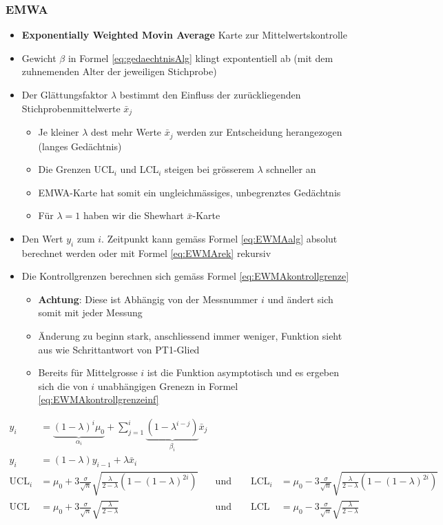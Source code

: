 \subsubsection{EMWA}
\begin{itemize}
	\item \textbf{Exponentially Weighted Movin Average} Karte zur Mittelwertskontrolle
	\item Gewicht $\beta$ in Formel \ref{eq:gedaechtnisAlg} klingt expontentiell ab (mit dem zuhnemenden \glqq Alter \grqq der jeweiligen Stichprobe)
	\item Der Glättungsfaktor $\lambda$ bestimmt den Einfluss der zurückliegenden Stichprobenmittelwerte $\bar{x}_j$
	\begin{itemize}
		\item Je kleiner $\lambda$ dest mehr Werte $\bar{x}_j$ werden zur Entscheidung herangezogen (langes Gedächtnis)
		\item Die Grenzen UCL$_i$ und LCL$_i$ steigen bei grösserem $\lambda$ schneller an
		\item EMWA-Karte hat somit ein ungleichmässiges, unbegrenztes Gedächtnis
		\item Für $\lambda=1$ haben wir die Shewhart $\bar{x}$-Karte
	\end{itemize}
	\item Den Wert $y_i$ zum $i.$ Zeitpunkt kann gemäss Formel \ref{eq:EWMAalg} absolut berechnet werden oder mit Formel \ref{eq:EWMArek} rekursiv
	\item Die Kontrollgrenzen berechnen sich gemäss Formel \ref{eq:EWMAkontrollgrenze}
	\begin{itemize}
		\item \textbf{Achtung}: Diese ist Abhängig von der Messnummer $i$ und ändert sich somit mit jeder Messung 
		\item Änderung zu beginn stark, anschliessend immer weniger, Funktion sieht aus wie Schrittantwort von PT1-Glied
		\item Bereits für Mittelgrosse $i$ ist die Funktion asymptotisch und es ergeben sich die von $i$ unabhängigen Grenezn in Formel \ref{eq:EWMAkontrollgrenzeinf}
	\end{itemize}
\end{itemize}
\begin{align}
	\label{eq:EWMAalg}
	y_i &= \underbrace{(1-\lambda)^{i}\mu_0}_{\alpha_i}+\sum_{j=1}^{i}\underbrace{(1-\lambda^{i-j})}_{\beta_i}\bar{x}_j\\
	\label{eq:EWMArek}
	y_i&=(1-\lambda)y_{i-1}+\lambda\bar{x}_i\\
	\label{eq:EWMAkontrollgrenze}
	\text{UCL}_i &= \mu_0 + 3\frac{\sigma}{\sqrt{n}}\sqrt{\frac{\lambda}{2-\lambda}(1-(1-\lambda)^{2i})}	\quad &\text{und} \qquad
	\text{LCL}_i &= \mu_0 - 3\frac{\sigma}{\sqrt{n}}\sqrt{\frac{\lambda}{2-\lambda}(1-(1-\lambda)^{2i})}\\
	\label{eq:EWMAkontrollgrenzeinf}
	\text{UCL} &= \mu_0 + 3\frac{\sigma}{\sqrt{n}}\sqrt{\frac{\lambda}{2-\lambda}} 	\quad &\text{und} \qquad
	\text{LCL} &= \mu_0 - 3\frac{\sigma}{\sqrt{n}}\sqrt{\frac{\lambda}{2-\lambda}}
\end{align}
